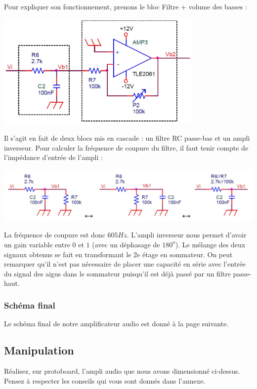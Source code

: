 \documentclass{../template/labo}
\begin{document}
Pour expliquer son fonctionnement, prenons le bloc Filtre + volume des basses :
\begin{center}
\includegraphics[width=10cm]{figures/AOPfiltrebasse}
\end{center}
Il s'agit en fait de deux blocs mis en cascade : un filtre RC passe-bas et un ampli inverseur.
Pour calculer la fréquence de coupure du filtre, il faut tenir compte de l'impédance d'entrée de l'ampli :
\begin{center}
\includegraphics[width=14cm]{figures/AOPfiltreRC}
\end{center}

La fréquence de coupure est donc $605Hz$.
L'ampli inverseur nous permet d'avoir un gain variable entre $0$ et $1$ (avec un déphasage de $180^{o}$).
Le mélange des deux signaux obtenus se fait en transformant le 2e étage en sommateur. On peut remarquer qu'il n'est pas nécessaire de placer une capacité en série avec l'entrée du signal des aigus dans le sommateur puisqu'il est déjà passé par un filtre passe-haut.

\subsubsection{Schéma final}
Le schéma final de notre amplificateur audio est donné à la page suivante.

\subsection{Manipulation}
\Question
{
Réalisez, sur protoboard, l'ampli audio que nous avons dimensionné ci-dessus. Pensez à respecter les conseils qui vous sont donnés dans l'annexe.
}
{}
\end{document}
